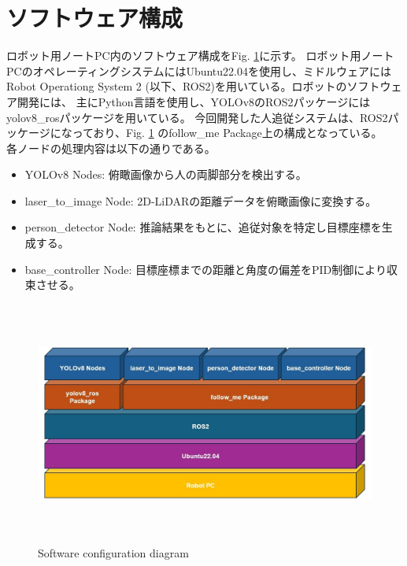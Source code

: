 \section{ソフトウェア構成}
ロボット用ノートPC内のソフトウェア構成をFig. \ref{Software configuration diagram}に示す。
ロボット用ノートPCのオペレーティングシステムにはUbuntu22.04を使用し、ミドルウェアには
Robot Operationg System 2 (以下、ROS2)を用いている。ロボットのソフトウェア開発には、
主にPython言語を使用し、YOLOv8のROS2パッケージにはyolov8\_rosパッケージを用いている。
今回開発した人追従システムは、ROS2パッケージになっており、Fig. \ref{Software configuration diagram}
のfollow\_me Package上の構成となっている。\\ \indent
各ノードの処理内容は以下の通りである。

\begin{itemize}
    \item YOLOv8 Nodes: 俯瞰画像から人の両脚部分を検出する。
    \item laser\_to\_image Node: 2D-LiDARの距離データを俯瞰画像に変換する。
    \item person\_detector Node: 推論結果をもとに、追従対象を特定し目標座標を生成する。
    \item base\_controller Node: 目標座標までの距離と角度の偏差をPID制御により収束させる。
\end{itemize}

\clearpage

\begin{figure}[t]
    \begin{center}
    \includegraphics[height=80mm,clip]{figure/Software.jpg}
    \caption{Software configuration diagram}
    \label{Software configuration diagram}
    \end{center}
\end{figure}

